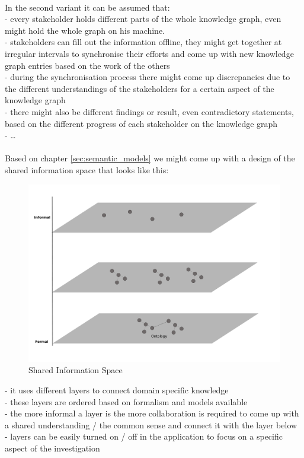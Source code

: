 \begin{appendices}
\\
In the second variant it can be assumed that: \\
- every stakeholder holds different parts of the whole knowledge graph, even might hold the whole graph on his machine. \\
- stakeholders can fill out the information offline, they might get together at irregular intervals to synchronise their efforts and
come up with new knowledge graph entries based on the work of the others \\
- during the synchronisation process there might come up discrepancies due to the different understandings of the stakeholders for a certain aspect of
the knowledge graph \\
- there might also be different findings or result, even contradictory statements, based on the different progress of each stakeholder on the knowledge graph \\
- \ldots \\
\\

Based on chapter \ref{sec:semantic_models} we might come up with a design of the shared information space that looks like this: \\

\begin{figure}[H]
	\centering
		\includegraphics[width=0.8\columnwidth]{images/sharedspace_layers.pdf}
	\caption{Shared Information Space}
\label{fig:images_sharedspace_layers}
\end{figure}

- it uses different layers to connect domain specific knowledge \\
- these layers are ordered based on formalism and models available \\
- the more informal a layer is the more collaboration is required to come up with a shared understanding / the common sense
and connect it with the layer below \\
- layers can be easily turned on / off in the application to focus on a specific aspect of the investigation \\
\\

\end{appendices}
